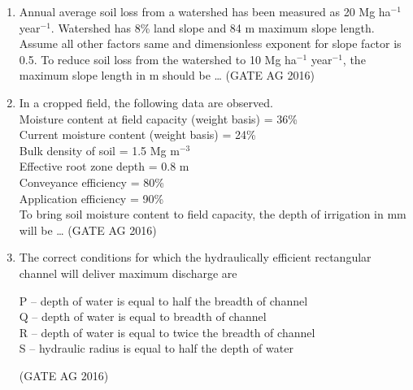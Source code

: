\documentclass[journal]{IEEEtran}
\begin{document}
\begin{enumerate}
\medskip


\item 
Annual average soil loss from a watershed has been measured as 20 Mg ha$^{-1}$ year$^{-1}$. Watershed has 8\% land slope and 84 m maximum slope length. Assume all other factors same and dimensionless exponent for slope factor is 0.5. To reduce soil loss from the watershed to 10 Mg ha$^{-1}$ year$^{-1}$, the maximum slope length in m should be \dots
\hfill(GATE AG 2016)\\

\medskip

\item 
In a cropped field, the following data are observed.\\
Moisture content at field capacity (weight basis) = 36\%\\
Current moisture content (weight basis) = 24\%\\
Bulk density of soil = 1.5 Mg m$^{-3}$\\
Effective root zone depth = 0.8 m\\
Conveyance efficiency = 80\%\\
Application efficiency = 90\%\\
To bring soil moisture content to field capacity, the depth of irrigation in mm will be \dots
\hfill(GATE AG 2016)\\

\medskip

\item 
The correct conditions for which the hydraulically efficient rectangular channel will deliver maximum discharge are

P -- depth of water is equal to half the breadth of channel\\
Q -- depth of water is equal to breadth of channel\\
R -- depth of water is equal to twice the breadth of channel\\
S -- hydraulic radius is equal to half the depth of water

\begin{enumerate}
\end{enumerate}
\hfill(GATE AG 2016)\\


\end{enumerate}
\end{document}
